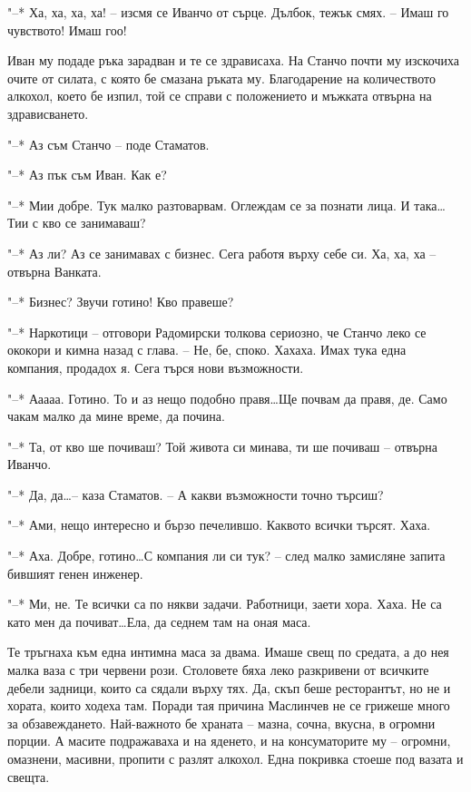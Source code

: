 \documentclass[ebook,openany,12pt]{memoir}
\begin{document}
"--* Ха, ха, ха, ха! – изсмя се Иванчо от сърце. Дълбок, тежък смях. – Имаш го чувството! Имаш гоо!

Иван му подаде ръка зарадван и те се здрависаха. На Станчо почти му изскочиха очите от силата, с която бе смазана ръката му. Благодарение на количеството алкохол, което бе изпил, той се справи с положението и мъжката отвърна на здрависването.

"--* Аз съм Станчо – поде Стаматов.

"--* Аз пък съм Иван. Как е?

"--* Мии добре. Тук малко разтоварвам. Оглеждам се за познати лица. И така\ldots Тии с кво се занимаваш?

"--* Аз ли? Аз се занимавах с бизнес. Сега работя върху себе си. Ха, ха, ха – отвърна Ванката.

"--* Бизнес? Звучи готино! Кво правеше?

"--* Наркотици – отговори Радомирски толкова сериозно, че Станчо леко се ококори и кимна назад с глава. – Не, бе, споко. Хахаха. Имах тука една компания, продадох я. Сега търся нови възможности. 

"--* Ааааа. Готино. То и аз нещо подобно правя\ldots Ще почвам да правя, де. Само чакам малко да мине време, да почина.

"--* Та, от кво ше почиваш? Той живота си минава, ти ше почиваш – отвърна Иванчо.

"--* Да, да\ldots -- каза Стаматов. – А какви възможности точно търсиш?

"--* Ами, нещо интересно и бързо печелившо. Каквото всички търсят. Хаха. 

"--* Аха. Добре, готино\ldots С компания ли си тук? – след малко замисляне запита бившият генен инженер. 

"--* Ми, не. Те всички са по някви задачи. Работници, заети хора. Хаха. Не са като мен да почиват\ldots Ела, да седнем там на оная маса.

Те тръгнаха към една интимна маса за двама. Имаше свещ по средата, а до нея малка ваза с три червени рози. Столовете бяха леко разкривени от всичките дебели задници, които са сядали върху тях. Да, скъп беше ресторантът, но не и хората, които ходеха там. Поради тая причина Маслинчев не се грижеше много за обзавеждането. Най-важното бе храната – мазна, сочна, вкусна, в огромни порции. А масите подражаваха и на яденето, и на консуматорите му – огромни, омазнени, масивни, пропити с разлят алкохол. Една покривка стоеше под вазата и свещта.
\end{document}
